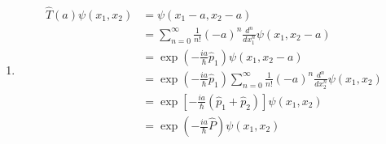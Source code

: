 \documentclass{article}
\begin{document}
\setcounter{subsection}{6}
\subsection{}

\begin{enumerate}
  \item

        \begin{align*}
          \hat{T}(a) \psi(x_1, x_2) & = \psi(x_1 - a, x_2 - a)                                                                                                      \\
                                    & = \sum_{n = 0}^\infty \frac{1}{n!} (-a)^n \frac{d^n}{d x_1^n} \psi(x_1, x_2 - a)                                              \\
                                    & = \exp \left( -\frac{i a}{\hbar} \hat{p}_1 \right) \psi(x_1, x_2 - a)                                                         \\
                                    & = \exp \left( -\frac{i a}{\hbar} \hat{p}_1 \right) \sum_{n = 0}^\infty \frac{1}{n!} (-a)^n \frac{d^n}{d x_2^n} \psi(x_1, x_2) \\
                                    & = \exp \left[ -\frac{i a}{\hbar} (\hat{p}_1 + \hat{p}_2) \right] \psi(x_1, x_2)                                               \\
                                    & = \exp \left( -\frac{i a}{\hbar} \hat{P} \right) \psi(x_1, x_2)
        \end{align*}
\end{enumerate}
\end{document}
